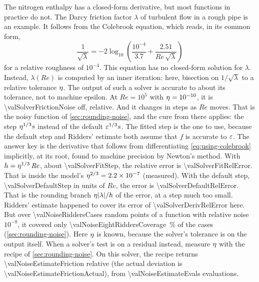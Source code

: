 The nitrogen enthalpy has a closed-form derivative, but most functions in practice do not. The Darcy friction factor
$\lambda$ of turbulent flow in a rough pipe is an example. It follows from the Colebrook equation, which reads, in its
common form,\cite{colebrook1939}
\begin{equation}
  \frac{1}{\sqrt{\lambda}} = -2 \log_{10}\left(\frac{10^{-4}}{3.7} + \frac{2.51}{\mathit{Re}\,\sqrt{\lambda}}\right)
  \label{eq:using-colebrook}
\end{equation}
for a relative roughness of $10^{-4}$. This equation has no closed-form solution for $\lambda$. Instead,
$\lambda(\mathit{Re})$ is computed by an inner iteration: here, bisection on $1/\sqrt{\lambda}$ to a relative
tolerance $\eta$.
The output of such a solver is accurate to about its tolerance, not to machine epsilon. At $\mathit{Re} = 10^5$ with
$\eta = 10^{-10}$, it is \num{\valSolverFrictionNoise} off, relative. And it changes in steps as $\mathit{Re}$
moves. That is the noisy function of \cref{sec:rounding-noise}, and the cure from there applies: the step
$\eta^{1/3} s$ instead of the default $\varepsilon^{1/3} s$.
The fitted step is the one to use, because the default step and Ridders' estimate both assume that $f$ is accurate to
$\varepsilon$. The answer key is the derivative that follows from differentiating \cref{eq:using-colebrook}
implicitly, at its root, found to machine precision by Newton's method. With $h = \eta^{1/3}\,\mathit{Re}$, about
\num{\valSolverFitStep}, the relative error is \num{\valSolverFitRelError}. That is inside the model's
$\eta^{2/3} = \num{2.2e-7}$ (measured). With the default step, \num{\valSolverDefaultStep} in
units of $\mathit{Re}$, the error is \num{\valSolverDefaultRelError}. That is the rounding branch
$\eta \lvert \lambda \rvert / h$ of the error, at a step much too small. Ridders' estimate happened to cover its error of
\num{\valSolverDerivRelError} here. But over \num{\valNoiseRiddersCases} random points of a function with relative
noise $10^{-8}$, it covered only \SI{\valNoiseEightRiddersCoverage}{\percent} of the cases
(\cref{sec:rounding-noise}). Here $\eta$ is known, because the solver's tolerance is on the output itself. When a
solver's test is on a residual instead, measure $\eta$ with the recipe of \cref{sec:rounding-noise}. On this
solver, the recipe returns \num{\valNoiseEstimateFriction} relative (the actual deviation is
\num{\valNoiseEstimateFrictionActual}), from \num{\valNoiseEstimateEvals} evaluations.

